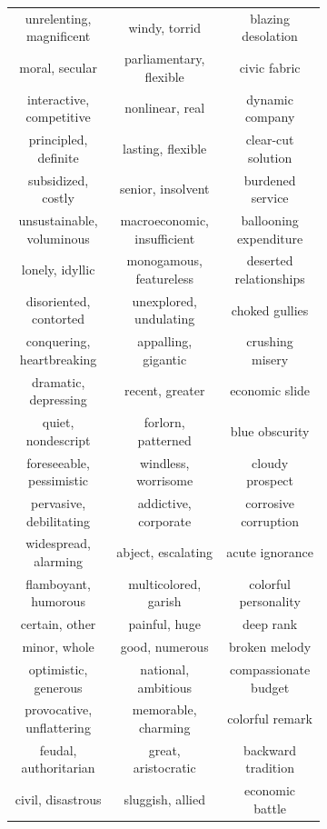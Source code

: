 \documentclass[OpenMind]{stjour}
\begin{document}
\begin{figure}
\begin{subfigure}{0.3\textwidth}
\begin{center}
\begin{tabular}{ c | c | c  }
			\tiny unrelenting, magnificent & \tiny windy, torrid & \tiny blazing desolation\\
			\tiny moral, secular & \tiny parliamentary, flexible & \tiny civic fabric\\
			\tiny interactive, competitive & \tiny nonlinear, real & \tiny dynamic company\\
			\tiny principled, definite & \tiny lasting, flexible & \tiny clear-cut solution\\
			\tiny subsidized, costly & \tiny senior, insolvent & \tiny burdened service\\
			\tiny unsustainable, voluminous & \tiny macroeconomic, insufficient & \tiny ballooning expenditure\\
			\tiny lonely, idyllic & \tiny monogamous, featureless & \tiny deserted relationships\\
			\tiny disoriented, contorted & \tiny unexplored, undulating & \tiny choked gullies\\
			\tiny conquering, heartbreaking & \tiny appalling, gigantic & \tiny crushing misery\\
			\tiny dramatic, depressing & \tiny recent, greater & \tiny economic slide\\
			\tiny quiet, nondescript & \tiny forlorn, patterned & \tiny blue obscurity\\
			\tiny foreseeable, pessimistic & \tiny windless, worrisome & \tiny cloudy prospect\\
			\tiny pervasive, debilitating & \tiny addictive, corporate & \tiny corrosive corruption\\
			\tiny widespread, alarming & \tiny abject, escalating & \tiny acute ignorance\\
			\tiny flamboyant, humorous & \tiny multicolored, garish & \tiny colorful personality\\
			\tiny certain, other & \tiny painful, huge & \tiny deep rank\\
			\tiny minor, whole & \tiny good, numerous & \tiny broken melody\\
			\tiny optimistic, generous & \tiny national, ambitious & \tiny compassionate budget\\
			\tiny provocative, unflattering & \tiny memorable, charming & \tiny colorful remark\\
			\tiny feudal, authoritarian & \tiny great, aristocratic & \tiny backward tradition\\
			\tiny civil, disastrous & \tiny sluggish, allied & \tiny economic battle\\

\end{tabular}
\end{center}
\end{subfigure}
\end{figure}
\end{document}
